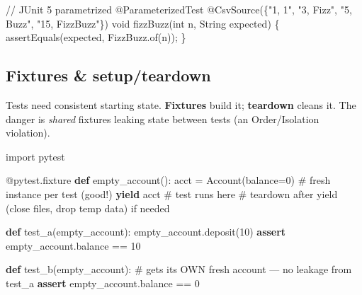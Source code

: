 \documentclass[11pt]{article}
\newenvironment{Shaded}{\begin{snugshade}}{\end{snugshade}}
\newcommand{\AttributeTok}[1]{\textcolor[rgb]{0.16,0.50,0.73}{#1}}
\newcommand{\BuiltInTok}[1]{\textcolor[rgb]{0.50,0.55,0.55}{#1}}
\newcommand{\CommentTok}[1]{\textcolor[rgb]{0.48,0.49,0.49}{#1}}
\newcommand{\ControlFlowTok}[1]{\textcolor[rgb]{0.99,0.74,0.29}{\textbf{#1}}}
\newcommand{\DataTypeTok}[1]{\textcolor[rgb]{0.16,0.50,0.73}{#1}}
\newcommand{\DecValTok}[1]{\textcolor[rgb]{0.96,0.45,0.00}{#1}}
\newcommand{\FunctionTok}[1]{\textcolor[rgb]{0.56,0.27,0.68}{#1}}
\newcommand{\ImportTok}[1]{\textcolor[rgb]{0.15,0.68,0.38}{#1}}
\newcommand{\KeywordTok}[1]{\textcolor[rgb]{0.81,0.81,0.76}{\textbf{#1}}}
\newcommand{\NormalTok}[1]{\textcolor[rgb]{0.81,0.81,0.76}{#1}}
\newcommand{\OperatorTok}[1]{\textcolor[rgb]{0.81,0.81,0.76}{#1}}
\newcommand{\StringTok}[1]{\textcolor[rgb]{0.96,0.31,0.31}{#1}}
\begin{document}

\begin{Shaded}
\begin{Highlighting}[]
\CommentTok{// JUnit 5 parametrized}
\AttributeTok{@ParameterizedTest}
\AttributeTok{@CsvSource}\OperatorTok{(\{}\StringTok{"1, 1"}\OperatorTok{,} \StringTok{"3, Fizz"}\OperatorTok{,} \StringTok{"5, Buzz"}\OperatorTok{,} \StringTok{"15, FizzBuzz"}\OperatorTok{\})}
\DataTypeTok{void} \FunctionTok{fizzBuzz}\OperatorTok{(}\DataTypeTok{int}\NormalTok{ n}\OperatorTok{,} \BuiltInTok{String}\NormalTok{ expected}\OperatorTok{)} \OperatorTok{\{}
    \FunctionTok{assertEquals}\OperatorTok{(}\NormalTok{expected}\OperatorTok{,}\NormalTok{ FizzBuzz}\OperatorTok{.}\FunctionTok{of}\OperatorTok{(}\NormalTok{n}\OperatorTok{));}
\OperatorTok{\}}
\end{Highlighting}
\end{Shaded}

\subsection{Fixtures \& setup/teardown}\label{fixtures--setupteardown}

Tests need consistent starting state. \textbf{Fixtures} build it; \textbf{teardown} cleans it. The danger is \emph{shared} fixtures leaking state between tests (an Order/Isolation violation).


\begin{Shaded}
\begin{Highlighting}[]
\ImportTok{import}\NormalTok{ pytest}

\AttributeTok{@pytest.fixture}
\KeywordTok{def}\NormalTok{ empty\_account():}
\NormalTok{    acct }\OperatorTok{=}\NormalTok{ Account(balance}\OperatorTok{=}\DecValTok{0}\NormalTok{)        }\CommentTok{\# fresh instance per test (good!)}
    \ControlFlowTok{yield}\NormalTok{ acct                       }\CommentTok{\# test runs here}
    \CommentTok{\# teardown after yield (close files, drop temp data) if needed}

\KeywordTok{def}\NormalTok{ test\_a(empty\_account):}
\NormalTok{    empty\_account.deposit(}\DecValTok{10}\NormalTok{)}
    \ControlFlowTok{assert}\NormalTok{ empty\_account.balance }\OperatorTok{==} \DecValTok{10}

\KeywordTok{def}\NormalTok{ test\_b(empty\_account):}
    \CommentTok{\# gets its OWN fresh account — no leakage from test\_a}
    \ControlFlowTok{assert}\NormalTok{ empty\_account.balance }\OperatorTok{==} \DecValTok{0}
\end{Highlighting}
\end{Shaded}
\end{document}
